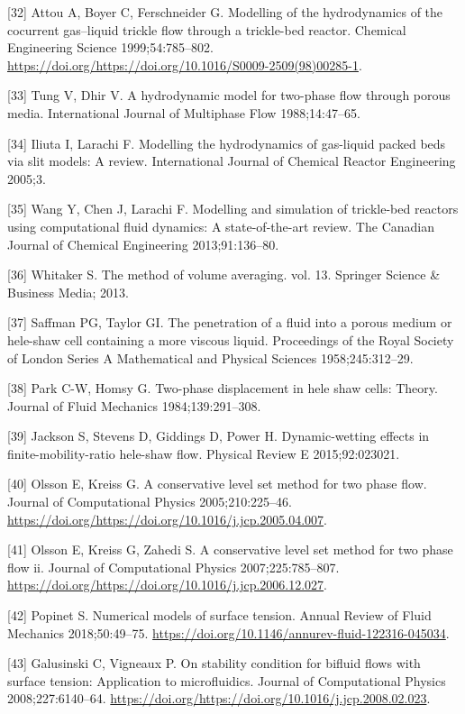 \documentclass[]{article}
\begin{document}
\leavevmode\hypertarget{ref-Attou1999}{}%
{[}32{]} Attou A, Boyer C, Ferschneider G. Modelling of the
hydrodynamics of the cocurrent gas--liquid trickle flow through a
trickle-bed reactor. Chemical Engineering Science 1999;54:785--802.
\url{https://doi.org/https://doi.org/10.1016/S0009-2509(98)00285-1}.

\leavevmode\hypertarget{ref-tung1988hydrodynamic}{}%
{[}33{]} Tung V, Dhir V. A hydrodynamic model for two-phase flow through
porous media. International Journal of Multiphase Flow 1988;14:47--65.

\leavevmode\hypertarget{ref-iliuta2005modelling}{}%
{[}34{]} Iliuta I, Larachi F. Modelling the hydrodynamics of gas-liquid
packed beds via slit models: A review. International Journal of Chemical
Reactor Engineering 2005;3.

\leavevmode\hypertarget{ref-wang2013modelling}{}%
{[}35{]} Wang Y, Chen J, Larachi F. Modelling and simulation of
trickle-bed reactors using computational fluid dynamics: A
state-of-the-art review. The Canadian Journal of Chemical Engineering
2013;91:136--80.

\leavevmode\hypertarget{ref-Whitaker2013}{}%
{[}36{]} Whitaker S. The method of volume averaging. vol. 13. Springer
Science \& Business Media; 2013.

\leavevmode\hypertarget{ref-saffman1958penetration}{}%
{[}37{]} Saffman PG, Taylor GI. The penetration of a fluid into a porous
medium or hele-shaw cell containing a more viscous liquid. Proceedings
of the Royal Society of London Series A Mathematical and Physical
Sciences 1958;245:312--29.

\leavevmode\hypertarget{ref-park1984two}{}%
{[}38{]} Park C-W, Homsy G. Two-phase displacement in hele shaw cells:
Theory. Journal of Fluid Mechanics 1984;139:291--308.

\leavevmode\hypertarget{ref-jackson2015dynamic}{}%
{[}39{]} Jackson S, Stevens D, Giddings D, Power H. Dynamic-wetting
effects in finite-mobility-ratio hele-shaw flow. Physical Review E
2015;92:023021.

\leavevmode\hypertarget{ref-Olsson2005}{}%
{[}40{]} Olsson E, Kreiss G. A conservative level set method for two
phase flow. Journal of Computational Physics 2005;210:225--46.
\url{https://doi.org/https://doi.org/10.1016/j.jcp.2005.04.007}.

\leavevmode\hypertarget{ref-Olsson2007}{}%
{[}41{]} Olsson E, Kreiss G, Zahedi S. A conservative level set method
for two phase flow ii. Journal of Computational Physics
2007;225:785--807.
\url{https://doi.org/https://doi.org/10.1016/j.jcp.2006.12.027}.

\leavevmode\hypertarget{ref-Popinet2018}{}%
{[}42{]} Popinet S. Numerical models of surface tension. Annual Review
of Fluid Mechanics 2018;50:49--75.
\url{https://doi.org/10.1146/annurev-fluid-122316-045034}.

\leavevmode\hypertarget{ref-Galusinski2008}{}%
{[}43{]} Galusinski C, Vigneaux P. On stability condition for bifluid
flows with surface tension: Application to microfluidics. Journal of
Computational Physics 2008;227:6140--64.
\url{https://doi.org/https://doi.org/10.1016/j.jcp.2008.02.023}.
\end{document}
